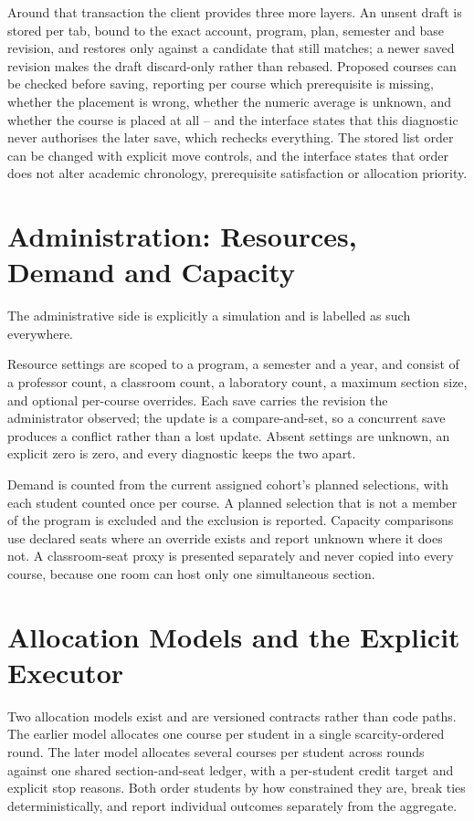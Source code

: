 Around that transaction the client provides three more layers. An unsent draft is stored per tab,
bound to the exact account, program, plan, semester and base revision, and restores only against a
candidate that still matches; a newer saved revision makes the draft discard-only rather than
rebased. Proposed courses can be checked before saving, reporting per course which prerequisite is
missing, whether the placement is wrong, whether the numeric average is unknown, and whether the
course is placed at all -- and the interface states that this diagnostic never authorises the later
save, which rechecks everything. The stored list order can be changed with explicit move controls,
and the interface states that order does not alter academic chronology, prerequisite satisfaction or
allocation priority.

\section{Administration: Resources, Demand and Capacity}

The administrative side is explicitly a simulation and is labelled as such everywhere.

Resource settings are scoped to a program, a semester and a year, and consist of a professor count,
a classroom count, a laboratory count, a maximum section size, and optional per-course overrides.
Each save carries the revision the administrator observed; the update is a compare-and-set, so a
concurrent save produces a conflict rather than a lost update. Absent settings are unknown, an
explicit zero is zero, and every diagnostic keeps the two apart.

Demand is counted from the current assigned cohort's planned selections, with each student counted
once per course. A planned selection that is not a member of the program is excluded and the
exclusion is reported. Capacity comparisons use declared seats where an override exists and report
unknown where it does not. A classroom-seat proxy is presented separately and never copied into
every course, because one room can host only one simultaneous section.

\section{Allocation Models and the Explicit Executor}

Two allocation models exist and are versioned contracts rather than code paths. The earlier model
allocates one course per student in a single scarcity-ordered round. The later model allocates
several courses per student across rounds against one shared section-and-seat ledger, with a
per-student credit target and explicit stop reasons. Both order students by how constrained they
are, break ties deterministically, and report individual outcomes separately from the aggregate.

